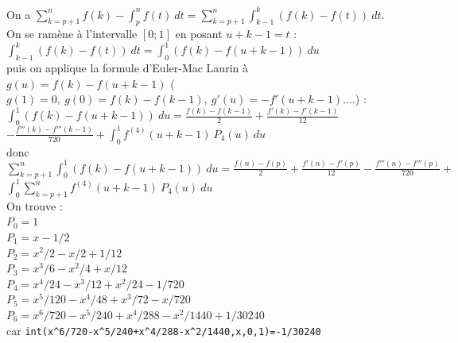 \documentclass[a4paper,11pt]{book}
\begin{document}
On a  $\sum_{k=p+1}^nf(k)-\int_p^n f(t) \ dt=\sum_{k=p+1}^n\int_{k-1}^k(f(k)- f(t)) \ dt$.\\
On se ram\`ene \`a l'intervalle $[0;1]$ en posant $u+k-1=t$ :\\
$\int_{k-1}^k(f(k)- f(t)) \ dt=\int_{0}^1(f(k)- f(u+k-1)) \ du$\\
puis on applique la formule d'Euler-Mac Laurin \`a 
$g(u)=f(k)- f(u+k-1)$ ($g(1)=0,\ g(0)=f(k)-f(k-1),\ g'(u)=-f'(u+k-1)....$) :\\
$\displaystyle \int_{0}^1(f(k)- f(u+k-1)) \ du=\frac{f(k)-f(k-1)}{2}+\frac{f'(k)-f'(k-1)}{12}$\\
$\displaystyle-\frac{f'''(k)-f'''(k-1)}{720}+\int_0^1 f^{(4)}(u+k-1)\ P_4(u)\ du$ \\
donc \\
$\displaystyle \sum_{k=p+1}^n\int_{0}^1(f(k)- f(u+k-1)) \ du=\frac{f(n)-f(p)}{2}+\frac{f'(n)-f'(p)}{12}-\frac{f'''(n)-f'''(p)}{720}+$\\
\hspace*{6cm}$\displaystyle\int_0^1 \sum_{k=p+1}^nf^{(4)}(u+k-1)\ P_4(u)\ du$\\
On trouve :\\
$P_0=1$\\
$P_1=x-1/2$\\
$P_2=x^2/2-x/2+1/12$\\
$P_3=x^3/6-x^2/4+x/12$\\
$P_4=x^4/24-x^3/12+x^2/24-1/720$\\
$P_5=x^5/120-x^4/48+x^3/72-x/720$\\
$P_6=x^6/720-x^5/240+x^4/288-x^2/1440+1/30240$\\
car {\tt int(x\verb|^|6/720-x\verb|^|5/240+x\verb|^|4/288-x\verb|^|2/1440,x,0,1)=-1/30240}\\
\end{document}
